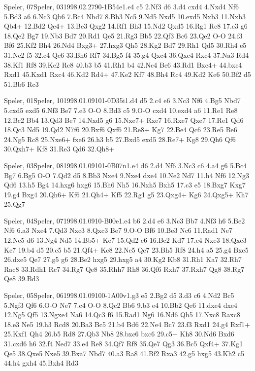 \documentclass[twocolumn,a4paper,10pt]{report}
\begin{document}
\begin{chessgame}{Speler, 07}{Speler, 03}{1998.02.27}{9}{0-1}{B54e}{1.e4 c5 2.Nf3 d6 3.d4 cxd4 4.Nxd4 Nf6 5.Bd3 a6 6.Nc3 Qb6 7.Bc4 Nbd7 8.Bb3 Nc5 9.Nd5 Nxd5 10.exd5 Nxb3 11.Nxb3 Qb4+ 12.Bd2 Qe4+ 13.Be3 Qxg2 14.Rf1 Bh3 15.Nd2 Qxd5 16.Rg1 Rc8 17.c3 g6 18.Qe2 Bg7 19.Nb3 Bd7 20.Rd1 Qe5 21.Rg3 Bb5 22.Qf3 Bc6 23.Qe2 O-O 24.f3 Bf6 25.Kf2 Bh4 26.Nd4 Bxg3+ 27.hxg3 Qh5 28.Kg2 Bd7 29.Rh1 Qd5 30.Rh4 e5 31.Nc2 f5 32.c4 Qe6 33.Bh6 Rf7 34.Bg5 f4 35.g4 Qxc4 36.Qxc4 Rxc4 37.Na3 Rd4 38.Kf1 Rf8 39.Ke2 Rc8 40.b3 b5 41.Rh1 b4 42.Nc4 Be6 43.Rd1 Bxc4+ 44.bxc4 Rxd1 45.Kxd1 Rxc4 46.Kd2 Rd4+ 47.Ke2 Kf7 48.Bh4 Rc4 49.Kd2 Ke6 50.Bf2 d5 51.Bb6 Rc3}\end{chessgame}
\begin{chessgame}{Speler, 01}{Speler, 10}{1998.01.09}{10}{1-0}{D35i}{1.d4 d5 2.c4 e6 3.Nc3 Nf6 4.Bg5 Nbd7 5.cxd5 exd5 6.Nf3 Be7 7.e3 O-O 8.Bd3 c5 9.O-O cxd4 10.exd4 a6 11.Re1 Re8 12.Bc2 Bb4 13.Qd3 Be7 14.Nxd5 g6 15.Nxe7+ Rxe7 16.Rxe7 Qxe7 17.Re1 Qd6 18.Qc3 Nd5 19.Qd2 N7f6 20.Bxf6 Qxf6 21.Re8+ Kg7 22.Be4 Qc6 23.Re5 Be6 24.Ng5 Rc8 25.Nxe6+ fxe6 26.h3 b5 27.Bxd5 exd5 28.Re7+ Kg8 29.Qh6 Qf6 30.Qxh7+ Kf8 31.Re3 Qd6 32.Qh8+}\end{chessgame}
\begin{chessgame}{Speler, 03}{Speler, 08}{1998.01.09}{10}{1-0}{B07n}{1.e4 d6 2.d4 Nf6 3.Nc3 c6 4.a4 g6 5.Bc4 Bg7 6.Bg5 O-O 7.Qd2 d5 8.Bb3 Nxe4 9.Nxe4 dxe4 10.Ne2 Nd7 11.h4 Nf6 12.Ng3 Qd6 13.h5 Bg4 14.hxg6 hxg6 15.Bh6 Nh5 16.Nxh5 Bxh5 17.c3 e5 18.Bxg7 Kxg7 19.g4 Bxg4 20.Qh6+ Kf6 21.Qh4+ Kf5 22.Rg1 g5 23.Qxg4+ Kg6 24.Qxg5+ Kh7 25.Qg7\mate}\end{chessgame}
\begin{chessgame}{Speler, 04}{Speler, 07}{1998.01.09}{10}{\textonehalf-\textonehalf}{B00e}{1.e4 b6 2.d4 e6 3.Nc3 Bb7 4.Nf3 h6 5.Be2 Nf6 6.a3 Nxe4 7.Qd3 Nxc3 8.Qxc3 Be7 9.O-O Bf6 10.Be3 Nc6 11.Rad1 Ne7 12.Ne5 d6 13.Ng4 Nd5 14.Bb5+ Ke7 15.Qd2 c6 16.Be2 Kd7 17.c4 Nxe3 18.Qxe3 Kc7 19.b4 d5 20.c5 b5 21.Qf4+ Kc8 22.Ne5 Qc7 23.Bh5 Rf8 24.h4 a5 25.g4 Bxe5 26.dxe5 Qe7 27.g5 g6 28.Be2 hxg5 29.hxg5 a4 30.Kg2 Kb8 31.Rh1 Ka7 32.Rh7 Rac8 33.Rdh1 Rc7 34.Rg7 Qe8 35.Rhh7 Rh8 36.Qf6 Rxh7 37.Rxh7 Qg8 38.Rg7 Qe8 39.Bd3}\end{chessgame}
\begin{chessgame}{Speler, 05}{Speler, 06}{1998.01.09}{10}{0-1}{A00v}{1.g3 e5 2.Bg2 d5 3.d3 c6 4.Nd2 Bc5 5.Ngf3 Qf6 6.O-O Ne7 7.c4 O-O 8.Qc2 Bb6 9.b3 e4 10.Bb2 Qe6 11.dxe4 dxe4 12.Ng5 Qf5 13.Ngxe4 Na6 14.Qc3 f6 15.Rad1 Ng6 16.Nd6 Qh5 17.Nxc8 Raxc8 18.e3 Ne5 19.h3 Rcd8 20.Ba3 Bc5 21.b4 Bd6 22.Ne4 Bc7 23.f3 Rxd1 24.g4 Rxf1+ 25.Kxf1 Qh4 26.b5 Rd8 27.Qb3 Nb8 28.bxc6 bxc6 29.c5+ Kh8 30.Nd6 Bxd6 31.cxd6 h6 32.f4 Ned7 33.e4 Re8 34.Qf7 Rf8 35.Qe7 Qg3 36.Bc5 Qxf4+ 37.Kg1 Qe5 38.Qxe5 Nxe5 39.Bxa7 Nbd7 40.a3 Ra8 41.Bf2 Rxa3 42.g5 hxg5 43.Kh2 c5 44.h4 gxh4 45.Bxh4 Rd3}\end{chessgame}
\end{document}
